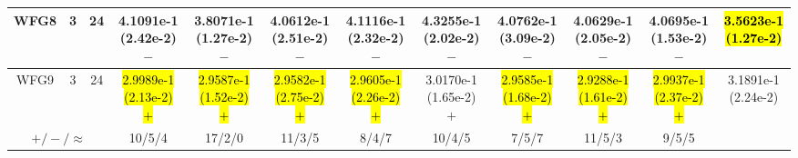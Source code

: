 \documentclass[journal]{IEEEtran}
\begin{document}
\begin{table*}[htbp]
\begin{tabular}{cccccccccccc}
\hline
\multirow{1}{*}{WFG8}&3&24&4.1091e-1 (2.42e-2) $-$&3.8071e-1 (1.27e-2) $-$&4.0612e-1 (2.51e-2) $-$&4.1116e-1 (2.32e-2) $-$&4.3255e-1 (2.02e-2) $-$&4.0762e-1 (3.09e-2) $-$&4.0629e-1 (2.05e-2) $-$&4.0695e-1 (1.53e-2) $-$&\hl{3.5623e-1 (1.27e-2)}\\
\hline
\multirow{1}{*}{WFG9}&3&24&\hl{2.9989e-1 (2.13e-2) $+$}&\hl{2.9587e-1 (1.52e-2) $+$}&\hl{2.9582e-1 (2.75e-2) $+$}&\hl{2.9605e-1 (2.26e-2) $+$}&3.0170e-1 (1.65e-2) $+$&\hl{2.9585e-1 (1.68e-2) $+$}&\hl{2.9288e-1 (1.61e-2) $+$}&\hl{2.9937e-1 (2.37e-2) $+$}&3.1891e-1 (2.24e-2)\\
\hline
\multicolumn{3}{c}{$+/-/\approx$}&10/5/4&17/2/0&11/3/5&8/4/7&10/4/5&7/5/7&11/5/3&9/5/5&\\
\bottomrule
\end{tabular}
\label{No Label}
\end{table*}
\end{document}
